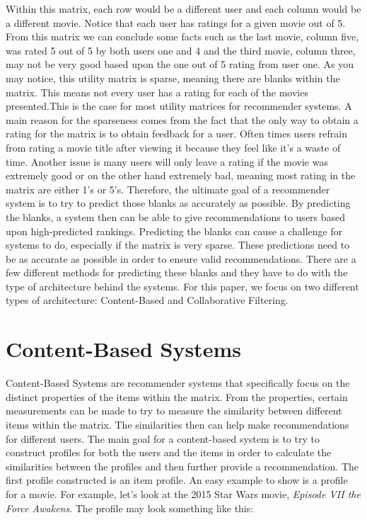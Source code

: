 \documentclass[11pt,reqno]{amsart}
\theoremstyle{definition}
\numberwithin{equation}{subsection}
\newcommand\tab[1][1cm]{\hspace*{#1}}
\begin{document}
Within this matrix, each row would be a different user and each column would be a different movie. Notice that each user has ratings for a given movie out of 5. From this matrix we can conclude some facts such as the last movie, column five, was rated 5 out of 5 by both users one and 4 and the third movie, column three, may not be very good based upon the one out of 5 rating from user one. As you may notice, this utility matrix is sparse, meaning there are blanks within the matrix. This means not every user has a rating for each of the movies presented.This is the case for most utility matrices for recommender systems. A main reason for the sparseness comes from the fact that the only way to obtain a rating for the matrix is to obtain feedback for a user. Often times users  refrain from rating a movie title after viewing it because they feel like it's a waste of time.  Another issue is many users will only leave a rating if the movie was extremely good or on the other hand extremely bad, meaning most rating in the matrix are either 1's or 5's. Therefore, the ultimate goal of a recommender system is to try to predict those blanks as accurately as possible. By predicting the blanks, a system then can be able to give recommendations to users based upon high-predicted rankings. Predicting the blanks can cause a challenge for systems to do, especially if the matrix is very sparse. These predictions need to be as accurate as possible in order to ensure valid recommendations. There are a few different methods for predicting these blanks and they have to do with the type of architecture behind the systems. For this paper, we focus on two different types of architecture: Content-Based and Collaborative Filtering.

\section{Content-Based Systems}

\tab Content-Based Systems are recommender systems that specifically focus on the distinct properties of the items within the matrix. From the properties, certain measurements can be made to try to measure the similarity between different items within the matrix. The similarities then can help make recommendations for different users. The main goal for a content-based system is to try to construct profiles for both the users and the items in order to calculate the similarities between the profiles and then further provide a recommendation. The first profile constructed is an item profile. An easy example to show is a profile for a movie. For example, let's look at the 2015 Star Wars movie, \textit{Episode VII the Force Awakens}. The profile may look something like this:
\end{document}
